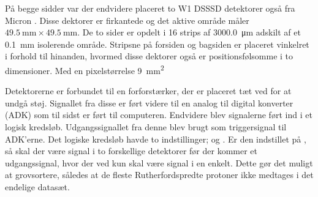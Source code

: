 På begge sidder var der endvidere placeret to W1 DSSSD detektorer også fra Micron \cite{micron-W1}. Disse dektorer er
firkantede og det aktive område måler ${\SI{49.5}{\mm} \times \SI{49.5}{\mm}}$. De to sider er
opdelt i 16 strips af \SI{3000.0}{\um} adskilt af et \SI{0.1}{\mm} isolerende område. Stripsne på
forsiden og bagsiden er placeret vinkelret i forhold til hinanden, hvormed disse dektorer også er
positionsfølsomme i to dimensioner. Med en pixelstørrelse \SI{9}{\mm\squared} 

Detektorerne er forbundet til en forforstærker, der er placeret tæt ved for at undgå støj. Signallet
fra disse er ført videre til en analog til digital konverter (ADK) som til sidst er ført til
computeren. Endvidere blev signalerne ført ind i et logisk kredsløb. Udgangssignallet fra denne blev
brugt som triggersignal til ADK'erne. Det logiske kredsløb havde to indstillinger; \lAND og \lOR. Er
den indstillet på \lAND, så skal der være signal i to forskellige detektorer før der kommer et
udgangssignal, hvor der ved \lOR kun skal være signal i en enkelt. Dette gør det muligt at
grovsortere, således at de fleste Rutherfordspredte protoner ikke medtages i det endelige
datasæt. 